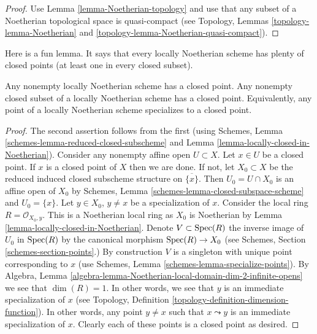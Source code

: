 \begin{proof}
Use Lemma \ref{lemma-Noetherian-topology}
and use that any subset of a Noetherian topological
space is quasi-compact (see Topology,
Lemmas \ref{topology-lemma-Noetherian} and
\ref{topology-lemma-Noetherian-quasi-compact}).
\end{proof}

\noindent
Here is a fun lemma.
It says that every locally Noetherian scheme has plenty of
closed points (at least one in every closed subset).

\begin{lemma}
\label{lemma-locally-Noetherian-closed-point}
Any nonempty locally Noetherian scheme has a closed point.
Any nonempty closed subset of a locally Noetherian scheme has a closed point.
Equivalently, any point of a locally Noetherian scheme specializes
to a closed point.
\end{lemma}

\begin{proof}
The second assertion follows from the first (using
Schemes, Lemma \ref{schemes-lemma-reduced-closed-subscheme}
and Lemma \ref{lemma-locally-closed-in-Noetherian}).
Consider any nonempty affine open $U \subset X$.
Let $x \in U$ be a closed point. If $x$ is a closed point
of $X$ then we are done. If not, let $X_0 \subset X$ be the
reduced induced closed subscheme structure on $\overline{\{x\}}$.
Then $U_0 = U \cap X_0$ is an affine open of $X_0$ by
Schemes, Lemma \ref{schemes-lemma-closed-subspace-scheme} and
$U_0 = \{x\}$. Let $y \in X_0$, $y \not = x$ be a specialization of $x$.
Consider the local ring $R = \mathcal{O}_{X_0, y}$.
This is a Noetherian local ring as $X_0$ is Noetherian
by Lemma \ref{lemma-locally-closed-in-Noetherian}. Denote $V \subset \mathop{\mathrm{Spec}}(R)$
the inverse image of $U_0$ in $\mathop{\mathrm{Spec}}(R)$ by the canonical morphism
$\mathop{\mathrm{Spec}}(R) \to X_0$ (see Schemes, Section \ref{schemes-section-points}.)
By construction $V$ is a singleton with unique point corresponding to $x$ (use
Schemes, Lemma \ref{schemes-lemma-specialize-points}).
By
Algebra, Lemma \ref{algebra-lemma-Noetherian-local-domain-dim-2-infinite-opens}
we see that $\dim(R) = 1$.
In other words, we see that $y$ is an immediate specialization
of $x$ (see Topology, Definition \ref{topology-definition-dimension-function}).
In other words, any
point $y \not = x$ such that $x \leadsto y$ is an immediate
specialization of $x$. Clearly each of these points is a
closed point as desired.
\end{proof}


